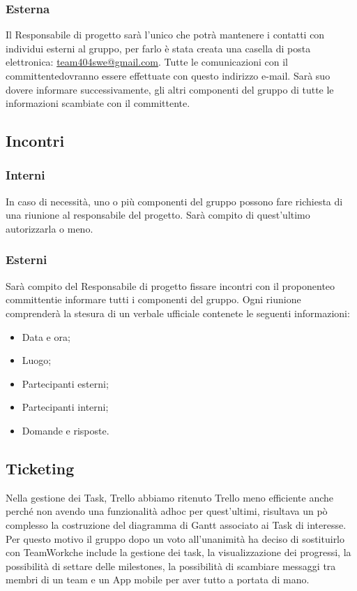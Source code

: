 \documentclass[a4paper,11pt]{article}
\begin{document}
			\subsubsection{Esterna}
			Il Responsabile di progetto sarà l'unico che potrà mantenere i contatti con individui esterni al gruppo, per farlo è stata creata una casella di posta elettronica: \url{team404swe@gmail.com}. Tutte le comunicazioni con il committente\addglos dovranno essere effettuate con questo indirizzo e-mail. Sarà suo dovere informare successivamente, gli altri componenti del gruppo di tutte le informazioni scambiate con il committente.
		\subsection{Incontri}
		\subsubsection{Interni}
		In caso di necessità, uno o più componenti del gruppo possono fare richiesta di una riunione al responsabile del progetto. Sarà compito di quest'ultimo autorizzarla o meno. 
		\subsubsection{Esterni}
		Sarà compito del Responsabile di progetto fissare incontri con il proponente\addglos o committenti\addglos e informare tutti i componenti del gruppo. Ogni riunione comprenderà la stesura di un verbale ufficiale contenete le seguenti informazioni:
\begin{itemize}
\item Data e ora;
\item Luogo;
\item Partecipanti esterni;
\item Partecipanti interni;
\item Domande e risposte.
\end{itemize}
		
		\subsection{Ticketing}
		\label{subsec:ticketing}
		Nella gestione dei Task, Trello abbiamo ritenuto Trello meno efficiente anche perché non avendo una funzionalità adhoc per quest'ultimi, risultava un pò complesso la costruzione del diagramma di Gantt associato ai Task di interesse. Per questo motivo il gruppo dopo un voto all'unanimità ha deciso di sostituirlo con TeamWork\addglos che include la gestione dei task, la visualizzazione dei progressi, la possibilità di settare delle milestones, la possibilità di scambiare messaggi tra membri di un team e un App mobile per aver tutto a portata di mano.
\end{document}
